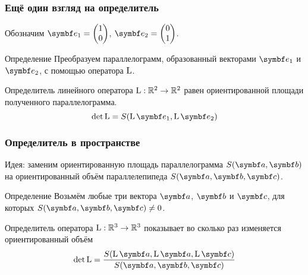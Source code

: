 \begin{frame}
    \frametitle{Ещё один взгляд на определитель}
    
    Обозначим $\be_1 = \begin{pmatrix}
        1 \\
        0 \\
    \end{pmatrix}$, $\be_2 = \begin{pmatrix}
        0 \\
        1 \\
    \end{pmatrix}$.

    \pause

    \begin{block}{Определение}
        Преобразуем параллелограмм, образованный векторами $\be_1$ и $\be_2$, с помощью оператора $\operatorname{L}$. 
        
        Определитель линейного оператора $\operatorname{L}:\mathbb{R}^2 \to \mathbb{R}^2$ равен ориентированной 
        площади полученного параллелограмма.
        \[
        \det \LL = S(\LL\be_1, \LL\be_2)    
        \]
        
    \end{block}
    
\end{frame}


\begin{frame}
    \frametitle{Определитель в пространстве}

    Идея: заменим ориентированную площадь параллелограмма $S(\ba, \bb)$ 
    на ориентированный объём параллелепипеда $S(\ba, \bb, \bc)$.
    
    \pause

\begin{block}{Определение}
    Возьмём любые три вектора $\ba$, $\bb$ и $\bc$, для которых $S(\ba, \bb, \bc)\neq 0$.

    \alert{Определитель} оператора $\operatorname{L}:\mathbb{R}^3 \to \mathbb{R}^3$ показывает во сколько раз изменяется
    ориентированный объём
    \[
    \det \LL = \frac{S(\LL\ba, \LL\ba, \LL\bc)}{S(\ba, \bb, \bc)}    
    \]
\end{block} 


\end{frame}



